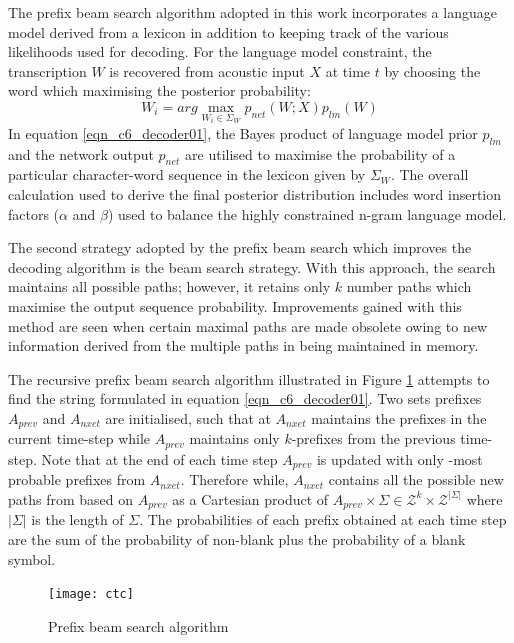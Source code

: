 The prefix beam search algorithm \cite{hannun2014first} adopted in this work incorporates a language model derived from a lexicon in addition to keeping track of the various likelihoods used for decoding.  For the language model constraint, the transcription $W$ is recovered from acoustic input $X$ at time $t$ by choosing the word which maximising the posterior probability:
\begin{equation}
W_i=arg\max_{W_i \in \Sigma_W} p_{net}(W;X)p_{lm}(W)
\label{eqn_c6_decoder01}
\end{equation}
In equation \ref{eqn_c6_decoder01}, the Bayes product of language model prior $p_{lm}$ and the network output $p_{net}$ are utilised to maximise the probability of a particular character-word sequence in the lexicon given by $\Sigma_W$.  The overall calculation used to derive the final posterior distribution includes word insertion factors ($\alpha$ and $\beta$) used to balance the highly constrained n-gram language model.

The second strategy adopted by the prefix beam search which improves the decoding algorithm is the beam search strategy.  With this approach, the search maintains all possible paths; however, it retains only $k$ number paths which maximise the output sequence probability.  Improvements gained with this method are seen when certain maximal paths are made obsolete owing to new information derived from the multiple paths in being maintained in memory. 

The recursive prefix beam search algorithm illustrated in Figure \ref{fig_c6_decoder01} attempts to find the string formulated in equation \ref{eqn_c6_decoder01}.  Two sets prefixes $A_{prev}$ and $A_{nxet}$ are initialised, such that at $A_{nxet}$ maintains the prefixes in the current time-step while $A_{prev}$ maintains only $k$-prefixes from the previous time-step.  Note that at the end of each time step $A_{prev}$ is updated with only -most probable prefixes from $A_{nxet}$. Therefore while,  $A_{nxet}$ contains all the possible new paths from based on $A_{prev}$ as a Cartesian product of $A_{prev} \times \Sigma \in \mathcal{Z}^k\times\mathcal{Z}^{|\Sigma|}$ where $|\Sigma|$ is the length of $\Sigma$. The probabilities of each prefix obtained at each time step are the sum of the probability of non-blank plus the probability of a blank symbol.
\begin{figure}
    \texttt{[image: ctc]}
    \caption{Prefix beam search algorithm}
    \label{fig_c6_decoder01}
\end{figure}

